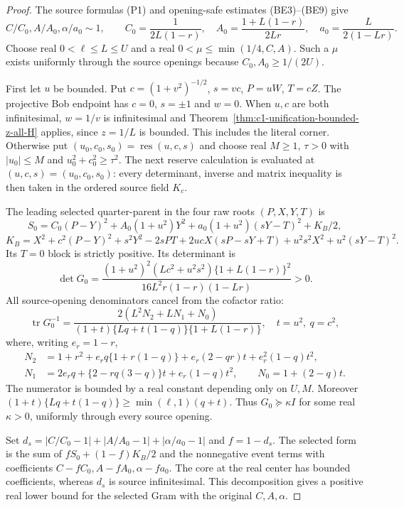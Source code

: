 \begin{proof}
The source formulas (P1) and opening-safe estimates (BE3)--(BE9) give
\[
 C/C_0,A/A_0,\alpha/a_0\sim1,\qquad
 C_0=\frac1{2L(1-r)},\quad
 A_0=\frac{1+L(1-r)}{2Lr},\quad
 a_0=\frac L{2(1-Lr)}.
\]
Choose real $0<\ell\le L\le U$ and a real
$0<\mu\le\min(1/4,C,A)$. Such a $\mu$ exists uniformly through
the source openings because $C_0,A_0\ge1/(2U)$.

First let $u$ be bounded. Put
$c=(1+v^2)^{-1/2}$, $s=vc$, $P=uW$, $T=cZ$.
The projective Bob endpoint has $c=0$, $s=\pm1$ and $w=0$.
When $u,c$ are both infinitesimal, $w=1/v$ is infinitesimal and
Theorem~\ref{thm:c1-unification-bounded-z-all-H} applies, since
$z=1/L$ is bounded. This includes the literal corner.
Otherwise put $(u_0,c_0,s_0)=\operatorname{res}(u,c,s)$ and choose
real $M\ge1$, $\tau>0$ with $|u_0|\le M$ and
$u_0^2+c_0^2\ge\tau^2$. The next reserve calculation is evaluated
at $(u,c,s)=(u_0,c_0,s_0)$: every determinant, inverse and matrix
inequality is then taken in the ordered source field $K_c$.

The leading selected quarter-parent in the four raw roots $(P,X,Y,T)$ is
\[
 S_0=C_0(P-Y)^2+A_0(1+u^2)Y^2
                   +a_0(1+u^2)(sY-T)^2+K_B/2,
\]
\[
 K_B=X^2+c^2(P-Y)^2+s^2Y^2-2sPT
 +2ucX(sP-sY+T)+u^2s^2X^2+u^2(sY-T)^2.
\]
Its $T=0$ block is strictly positive. Its determinant is
\[
 \det G_0=\frac{(1+u^2)^2(Lc^2+u^2s^2)
                 \{1+L(1-r)\}^2}{16L^2r(1-r)(1-Lr)}>0.
\]
All source-opening denominators cancel from the cofactor ratio:
\[
 \operatorname{tr}G_0^{-1}
 =\frac{2(L^2N_2+LN_1+N_0)}
 {(1+t)\{Lq+t(1-q)\}\{1+L(1-r)\}},\quad t=u^2,\ q=c^2,
\]
where, writing $e_r=1-r$,
\begin{align*}
 N_2&=1+r^2+e_rq\{1+r(1-q)\}+e_r(2-qr)t+e_r^2(1-q)t^2,\\
 N_1&=2e_rq+\{2-rq(3-q)\}t+e_r(1-q)t^2,\qquad
 N_0=1+(2-q)t.
\end{align*}
The numerator is bounded by a real constant depending only on $U,M$.
Moreover $(1+t)\{Lq+t(1-q)\}\ge\min(\ell,1)(q+t)$.
Thus $G_0\succeq\kappa I$ for some real $\kappa>0$, uniformly
through every source opening.

Set $d_s=|C/C_0-1|+|A/A_0-1|+|\alpha/a_0-1|$ and $f=1-d_s$.
The selected form is the sum of $fS_0+(1-f)K_B/2$ and the
nonnegative event terms with coefficients
$C-fC_0,A-fA_0,\alpha-fa_0$.
The core at the real center has bounded coefficients, whereas $d_s$
is source infinitesimal. This decomposition gives a positive real
lower bound for the selected Gram with the original $C,A,\alpha$.


\end{proof}
